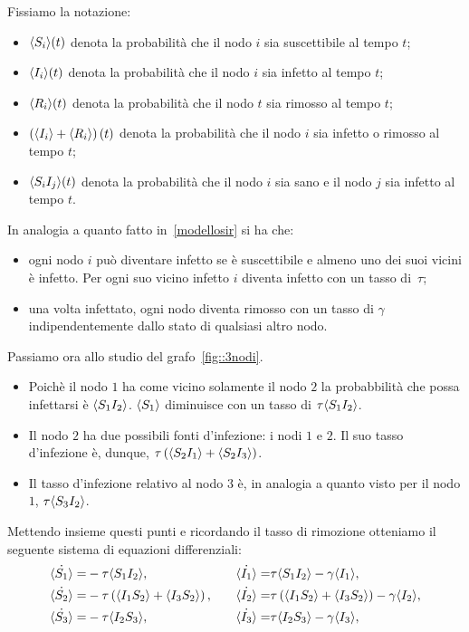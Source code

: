 Fissiamo la notazione:
\begin{itemize}
	\item  $\langle S_i \rangle(t)$  denota la probabilit\`a che il nodo $i$ sia suscettibile al tempo $t$;
	\item   $\langle I_i \rangle(t)$  denota la probabilit\`a che il nodo $i$ sia infetto al tempo $t$;
	\item  $\langle R_i \rangle(t)$  denota la probabilit\`a che il nodo $t$ sia rimosso al tempo $t$;
	\item $\left(  \langle  I_i \rangle+ \langle  R_i \rangle \right)(t)$ denota la probabilit\`a che il nodo $i$ sia infetto o rimosso al tempo $t$;
	\item $\langle S_iI_j \rangle(t)$ denota la probabilit\`a che il nodo $i$ sia sano e il nodo $j$ sia infetto al tempo $t$.
	\end{itemize}
In analogia a quanto fatto in~\ref{modellosir} si ha che:
\begin{itemize}
	\item ogni nodo $i$ pu\`o diventare infetto se \`e suscettibile e almeno uno dei suoi vicini \`e infetto. Per ogni suo vicino infetto $i$ diventa infetto con un tasso di~$\tau$;
	\item una volta infettato, ogni nodo diventa rimosso con un tasso di $\gamma$ indipendentemente dallo stato di qualsiasi altro nodo.
\end{itemize}
\newpage
Passiamo ora allo studio del grafo~\ref{fig::3nodi}.
\begin{itemize}
	

\item Poich\`e il nodo $1$ ha come vicino solamente il nodo $2$ la probabbilit\`a che possa infettarsi \`e $\langle S_1 I_2 \rangle $. $\langle S_1 \rangle$ diminuisce con un tasso di $\tau \langle S_1 I_2 \rangle$.
\item Il nodo $2$ ha due possibili fonti d'infezione: i nodi $1$ e $2$. Il suo tasso d'infezione \`e, dunque,  $\tau \left(  \langle S_2I_1 \rangle + \langle S_2 I_3 \rangle \right)$.
\item Il tasso d'infezione relativo al nodo $3$ \`e,  
in analogia a quanto visto per il nodo $1$, $\tau\langle S_3I_2 \rangle$.
\end{itemize}
Mettendo insieme questi punti e ricordando il tasso di rimozione otteniamo il seguente sistema di equazioni differenziali:
\begin{equation*}
\begin{aligned}
	\dot{\langle S_1 \rangle} = & -\tau \langle  S_1 I_2 \rangle, 
\quad &
	\dot{\langle I_1 \rangle} = & \tau \langle S_1 I_2 \rangle-\gamma \langle I_1 \rangle, 
\\
	\dot{\langle S_2 \rangle} = & -\tau \left(  \langle  I_1 S_2 \rangle + \langle I_3S_2 \rangle \right),	
\quad & 
	\dot{\langle I_2 \rangle} = & \tau \left(  \langle  I_1 S_2 \rangle + \langle I_3S_2 \rangle \right)-\gamma \langle I_2 \rangle,
\\
	\dot{\langle S_3 \rangle} = & -\tau \langle  I_2 S_3 \rangle,
\quad & 
	\dot{\langle I_3 \rangle} = & \tau \langle  I_2 S_3 \rangle-\gamma \langle I_3 \rangle,
\end{aligned}
\end{equation*}

